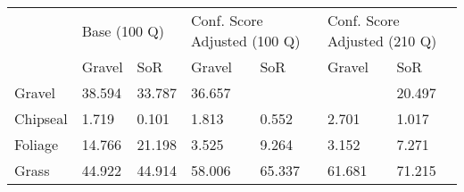 \documentclass[journal,onecolumn]{IEEEtran}
\begin{document}
	\begin{table}[H]
	\centering
	\begin{tabular}{l|ll|ll|ll|}
		\cline{2-7}
		\multirow{3}{*}{}              & \multicolumn{2}{l|}{\multirow{2}{*}{Base (100 Q)}} & \multicolumn{2}{l|}{\multirow{2}{*}{Conf. Score Adjusted (100 Q)}} & \multicolumn{2}{l|}{\multirow{2}{*}{Conf. Score Adjusted (210 Q)}} \\
		& \multicolumn{2}{l|}{}                              & \multicolumn{2}{l|}{}                                              & \multicolumn{2}{l|}{}                                              \\ \cline{2-7} 
		& \multicolumn{1}{l|}{Gravel}        & SoR           & \multicolumn{1}{l|}{Gravel}                & SoR                   & \multicolumn{1}{l|}{Gravel}                & SoR                   \\ \hline
		\multicolumn{1}{|l|}{Gravel}   & \multicolumn{1}{l|}{38.594}        & 33.787        & \multicolumn{1}{l|}{36.657}                & \centering{24.847}                & \multicolumn{1}{l|}{\centering32.466}                & 20.497                \\ \hline
		\multicolumn{1}{|l|}{Chipseal} & \multicolumn{1}{l|}{1.719}         & 0.101         & \multicolumn{1}{l|}{1.813}                 & 0.552                 & \multicolumn{1}{l|}{2.701}                 & 1.017                 \\ \hline
		\multicolumn{1}{|l|}{Foliage}  & \multicolumn{1}{l|}{14.766}        & 21.198        & \multicolumn{1}{l|}{3.525}                 & 9.264                 & \multicolumn{1}{l|}{3.152}                 & 7.271                 \\ \hline
		\multicolumn{1}{|l|}{Grass}    & \multicolumn{1}{l|}{44.922}        & 44.914        & \multicolumn{1}{l|}{58.006}                & 65.337                & \multicolumn{1}{l|}{61.681}                & 71.215                \\ \hline
	\end{tabular}
\end{table}
\end{document}
